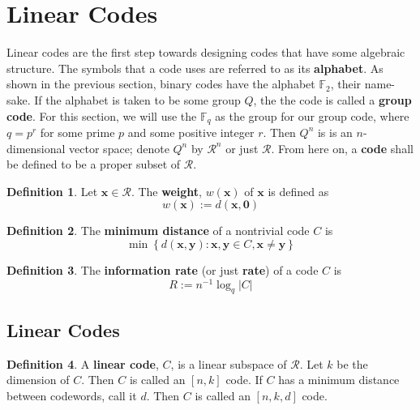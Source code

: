 \documentclass{article}
\newcommand{\F}{\mathbb{F}}
\newcommand{\calR}{\mathcal{R}}
\renewcommand{\=}{\equiv}
\renewcommand{\i}{^{-1}}
\newcommand{\set}[1]{\left\{ #1 \right\}}
\renewcommand{\v}{\mathbf}
\newcommand{\x}{{\v x}}
\newcommand{\y}{{\v y}}
\theoremstyle{plain}
\theoremstyle{definition}
\newtheorem{defn}{Definition}[subsection]
\begin{document}
\section{Linear Codes}

Linear codes are the first step towards designing codes that have some algebraic structure.
The symbols that a code uses are referred to as its \textbf{alphabet}. As shown in the previous section, binary codes have the alphabet $\F_2$, their name-sake.
If the alphabet is taken to be some group $Q$, the the code is called a \textbf{group code}.
For this section, we will use the $\F_q$ as the group for our group code, where $q = p^r$ for some prime $p$ and some positive integer $r$.
Then $Q^n$ is is an $n$-dimensional vector space; denote $Q^n$ by $\calR^n$ or just $\calR$.
From here on, a \textbf{code} shall be defined to be a proper subset of $\calR$.

\begin{defn}
Let $\x \in \calR$.
The \textbf{weight}, $w(\x)$ of $\x$ is defined as
$$ w(\x) := d(\x, \v 0) $$
\end{defn}

\begin{defn}
The \textbf{minimum distance} of a nontrivial code $C$ is
$$ \min\set{ d(\x, \y) : \x,\y \in C, \x \neq \y } $$
\end{defn}

\begin{defn}
The \textbf{information rate} (or just \textbf{rate}) of a code $C$ is
$$ R := n\i \log_q |C| $$
\end{defn}

\subsection{Linear Codes}

\begin{defn}
A \textbf{linear code}, $C$, is a linear subspace of $\calR$.
Let $k$ be the dimension of $C$.
Then $C$ is called an $[n, k]$ code.
If $C$ has a minimum distance between codewords, call it $d$.
Then $C$ is called an $[n, k, d]$ code.
\end{defn}
\end{document}

